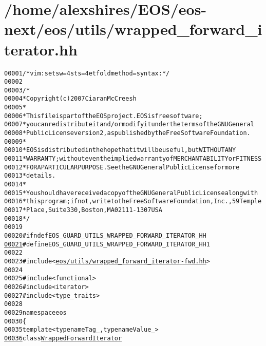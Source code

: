 \hypertarget{wrapped__forward__iterator_8hh_source}{
\section{/home/alexshires/EOS/eos-\/next/eos/utils/wrapped\_\-forward\_\-iterator.hh}
}


\begin{footnotesize}\begin{alltt}
00001 \textcolor{comment}{/* vim: set sw=4 sts=4 et foldmethod=syntax : */}
00002 
00003 \textcolor{comment}{/*}
00004 \textcolor{comment}{ * Copyright (c) 2007 Ciaran McCreesh}
00005 \textcolor{comment}{ *}
00006 \textcolor{comment}{ * This file is part of the EOS project. EOS is free software;}
00007 \textcolor{comment}{ * you can redistribute it and/or modify it under the terms of the GNU General}
00008 \textcolor{comment}{ * Public License version 2, as published by the Free Software Foundation.}
00009 \textcolor{comment}{ *}
00010 \textcolor{comment}{ * EOS is distributed in the hope that it will be useful, but WITHOUT ANY}
00011 \textcolor{comment}{ * WARRANTY; without even the implied warranty of MERCHANTABILITY or FITNESS}
00012 \textcolor{comment}{ * FOR A PARTICULAR PURPOSE.  See the GNU General Public License for more}
00013 \textcolor{comment}{ * details.}
00014 \textcolor{comment}{ *}
00015 \textcolor{comment}{ * You should have received a copy of the GNU General Public License along with}
00016 \textcolor{comment}{ * this program; if not, write to the Free Software Foundation, Inc., 59 Temple}
00017 \textcolor{comment}{ * Place, Suite 330, Boston, MA  02111-1307  USA}
00018 \textcolor{comment}{ */}
00019 
00020 \textcolor{preprocessor}{#ifndef EOS\_GUARD\_UTILS\_WRAPPED\_FORWARD\_ITERATOR\_HH}
\hypertarget{wrapped__forward__iterator_8hh_source_l00021}{}\hyperlink{wrapped__forward__iterator_8hh_aba45de1b4a0ff3c586dddb739af59bbe}{00021} \textcolor{preprocessor}{}\textcolor{preprocessor}{#define EOS\_GUARD\_UTILS\_WRAPPED\_FORWARD\_ITERATOR\_HH 1}
00022 \textcolor{preprocessor}{}
00023 \textcolor{preprocessor}{#include <\hyperlink{wrapped__forward__iterator-fwd_8hh}{eos/utils/wrapped_forward_iterator-fwd.hh}>}
00024 
00025 \textcolor{preprocessor}{#include <functional>}
00026 \textcolor{preprocessor}{#include <iterator>}
00027 \textcolor{preprocessor}{#include <type\_traits>}
00028 
00029 \textcolor{keyword}{namespace }eos
00030 \{
00035     \textcolor{keyword}{template} <\textcolor{keyword}{typename} Tag\_, \textcolor{keyword}{typename} Value\_>
\hypertarget{wrapped__forward__iterator_8hh_source_l00036}{}\hyperlink{classeos_1_1WrappedForwardIterator}{00036}     \textcolor{keyword}{class }\hyperlink{classeos_1_1WrappedForwardIterator}{WrappedForwardIterator}

\end{alltt}
\end{footnotesize}
